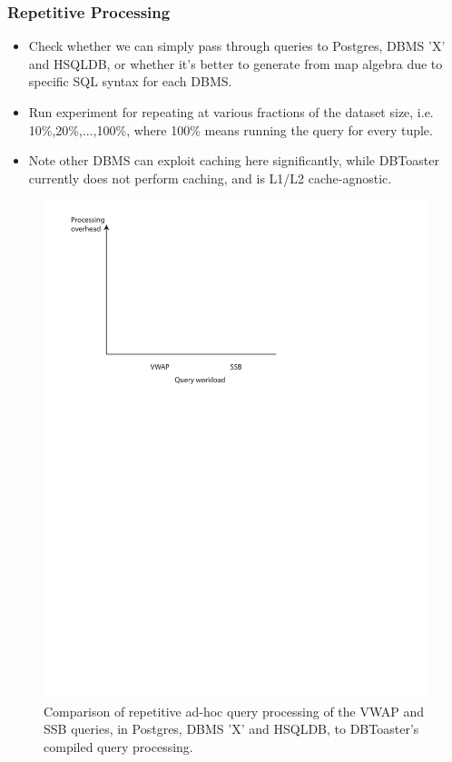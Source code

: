 \documentclass{sig-alternate}
\begin{document}
\subsubsection{Repetitive Processing}
\begin{itemize}
\item Check whether we can simply pass through queries to Postgres, DBMS 'X' and
  HSQLDB, or whether it's better to generate from map algebra due to specific
  SQL syntax for each DBMS.
\item Run experiment for repeating at various fractions of the dataset size,
  i.e. 10\%,20\%,...,100\%, where 100\% means running the query for every tuple.
\item Note other DBMS can exploit caching here significantly, while DBToaster
  currently does not perform caching, and is L1/L2 cache-agnostic.
\end{itemize}

\begin{figure}
\includegraphics[scale=0.6]{figures/axes-repetitive.pdf}
\caption{Comparison of repetitive ad-hoc query processing of the VWAP and SSB
queries, in Postgres, DBMS 'X' and HSQLDB, to DBToaster's compiled query
processing.}
\label{fig:overhead-repetition}
\end{figure}
\end{document}
